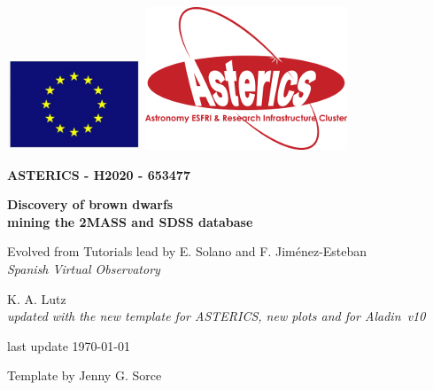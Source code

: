 \documentclass [a4paper, 12pt]{article}
\newcommand{\aladin}{{\textsc{A}{ladin}}}
\begin{document}
\begin{center}\includegraphics[width=0.3\textwidth]{../images/logo_euro.png} 
\hspace{5cm}\includegraphics[width=0.4 
\textwidth]{../images/logo_asterics.png}\\
\vspace{1.5cm}
\begin{Huge} \textbf{ASTERICS - H2020 - 653477} \end{Huge} \end{center}

 
 \vspace{1cm}
\Huge
\begin{center}
\bf Discovery of brown dwarfs \\ mining the 2MASS and SDSS database
  \end{center}

 
\vspace{1cm}
\large
\begin{center}
Evolved from Tutorials lead by E. Solano and F. Jim\'enez-Esteban\\ %
\textit{Spanish Virtual Observatory}
\end{center}
\vspace{0.5cm}
\begin{center}
K. A. Lutz\\
\textit{updated with the new template for ASTERICS, new plots and for \aladin\ 
v10}
\end{center}
\vspace{0.5cm}
\begin{center}
last update \today
\end{center}


\vspace{3.5cm}
Template by Jenny G. Sorce


\newpage
\normalsize
\vfill
\tableofcontents
\vfill
\end{document}
